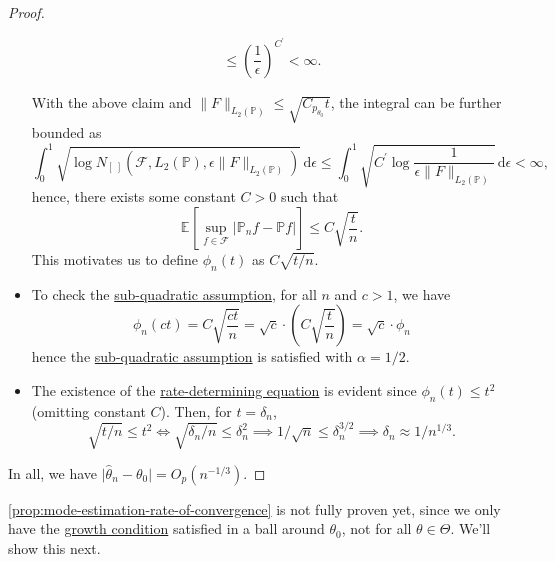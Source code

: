 \begin{proof}
\begin{itemize}
\begin{claim}
\[				      \leq \left( \frac{1}{\epsilon } \right) ^{C^{\prime} } < \infty .
			      \]
		      \end{claim}
		      With the above claim and \(\lVert F \rVert _{L_2(\mathbb{P} )} \leq \sqrt{C_{p_{\theta _0}} t} \), the integral can be further bounded as
		      \[
			      \int_{0}^{1} \sqrt{\log N_{[\ ]}(\mathscr{F} , L_2(\mathbb{P} ), \epsilon \lVert F \rVert _{L_2(\mathbb{P} )})} \,\mathrm{d}\epsilon
			      \leq \int_{0}^{1} \sqrt{C^{\prime} \log \frac{1}{\epsilon \lVert F \rVert _{L_2(\mathbb{P} )}} } \,\mathrm{d}\epsilon
			      < \infty,
		      \]
		      hence, there exists some constant \(C> 0\) such that
		      \[
			      \mathbb{E}_{}\left[\sup _{f\in \mathscr{F} } \vert \mathbb{P} _n f - \mathbb{P} f \vert  \right]
			      \leq C \sqrt{\frac{t}{n}}.
		      \]
		      This motivates us to define \(\phi _n (t)\) as \(C \sqrt{t / n} \).
		\item To check the \hyperref[def:sub-quadratic-assumption]{sub-quadratic assumption}, for all \(n\) and \(c > 1\), we have
		      \[
			      \phi _n (ct)
			      = C \sqrt{\frac{ct}{n}}
			      = \sqrt{c} \cdot \left( C \sqrt{\frac{t}{n}} \right)
			      = \sqrt{c} \cdot \phi _n
		      \]
		      hence the \hyperref[def:sub-quadratic-assumption]{sub-quadratic assumption} is satisfied with \(\alpha = 1 / 2\).
		\item The existence of the \hyperref[def:rate-determining-equation]{rate-determining equation} is evident since \(\phi _n(t) \leq t^2\) (omitting constant \(C\)). Then, for \(t = \delta _n\),
		      \[
			      \sqrt{t / n} \leq t^2
			      \iff \sqrt{\delta _n / n} \leq \delta _n^2
			      \implies 1 / \sqrt{n} \leq \delta _n^{3 / 2}
			      \implies \delta _n \approx 1 / n^{1 / 3}.
		      \]
	\end{itemize}
	In all, we have \(\vert \hat{\theta} _n - \theta _0 \vert = O_p(n^{-1 / 3})\).
\end{proof}

\autoref{prop:mode-estimation-rate-of-convergence} is not fully proven yet, since we only have the \hyperref[def:growth-condition*]{growth condition} satisfied in a ball around \(\theta _0\), not for all \(\theta \in \Theta \). We'll show this next.